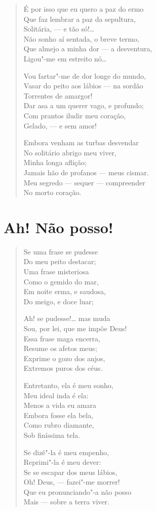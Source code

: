 \begin{verse}
É por isso que eu quero a paz do ermo\\
Que faz lembrar a paz da sepultura,\\
Solitária, --- e tão só!\ldots{}\\
Não sonho aí sentada, o breve termo,\\
Que almejo a minha dor --- a desventura,\\
Ligou"-me em estreito nó\ldots{}

Vou fartar"-me de dor longe do mundo,\\
Vasar do peito aos lábios --- na sordão\\
Torrentes de amargor!\\
Dar asa a um querer vago, e profundo;\\
Com prantos iludir meu coração,\\
Gelado, --- e sem amor!

Embora venham as turbas desvendar\\
No solitário abrigo meu viver,\\
Minha longa aflição;\\
Jamais hão de profanos --- meus cismar.\\
Meu segredo --- sequer --- compreender\\
No morto coração.
\end{verse}

\chapter{Ah! Não posso!}

\begin{verse}
Se uma frase se pudesse\\
Do meu peito destacar;\\
Uma frase misteriosa\\
Como o gemido do mar,\\
Em noite erma, e saudosa,\\
Do meigo, e doce luar;

Ah! se pudesse!\ldots{} mas muda\\
Sou, por lei, que me impõe Deus!\\
Essa frase maga encerra,\\
Resume os afetos meus;\\
Exprime o gozo dos anjos,\\
Extremos puros dos céus.

Entretanto, ela é meu sonho,\\
Meu ideal inda é ela:\\
Menos a vida eu amara\\
Embora fosse ela bela,\\
Como rubro diamante,\\
Sob finíssima tela.

Se dizê"-la é meu empenho,\\
Reprimi"-la é meu dever:\\
Se se escapar dos meus lábios,\\
Oh! Deus, --- fazei"-me morrer!\\
Que eu pronunciando"-a não posso\\
Mais --- sobre a terra viver.
\end{verse}

